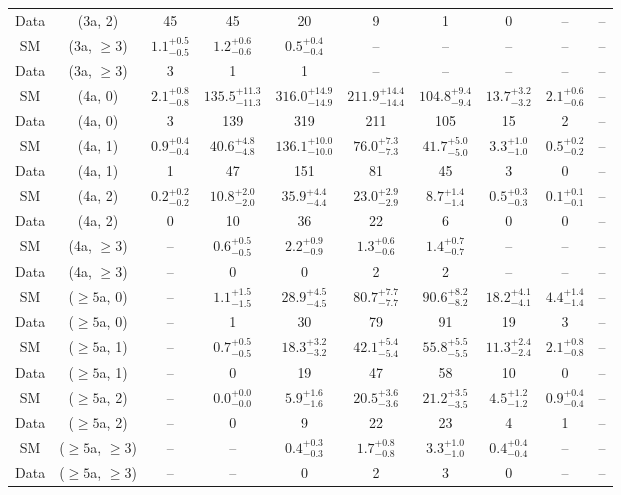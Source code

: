 \begin{table}[h!]
{\begin{tabular}{cccccccccc}
	Data & (3a, 2) & 45 & 45 & 20 & 9 & 1 & 0 & -- & -- \\[0.5ex] 
	SM & (3a, $\ge3$) & $1.1^{+ 0.5 }_{- 0.5 }$ & $1.2^{+ 0.6 }_{- 0.6 }$ & $0.5^{+ 0.4 }_{- 0.4 }$ & -- & -- & -- & -- & -- \\[0.5ex] 
	Data & (3a, $\ge3$) & 3 & 1 & 1 & -- & -- & -- & -- & -- \\[0.5ex] 
	SM & (4a, 0) & $2.1^{+ 0.8 }_{- 0.8 }$ & $135.5^{+ 11.3 }_{- 11.3 }$ & $316.0^{+ 14.9 }_{- 14.9 }$ & $211.9^{+ 14.4 }_{- 14.4 }$ & $104.8^{+ 9.4 }_{- 9.4 }$ & $13.7^{+ 3.2 }_{- 3.2 }$ & $2.1^{+ 0.6 }_{- 0.6 }$ & -- \\[0.5ex] 
	Data & (4a, 0) & 3 & 139 & 319 & 211 & 105 & 15 & 2 & -- \\[0.5ex] 
	SM & (4a, 1) & $0.9^{+ 0.4 }_{- 0.4 }$ & $40.6^{+ 4.8 }_{- 4.8 }$ & $136.1^{+ 10.0 }_{- 10.0 }$ & $76.0^{+ 7.3 }_{- 7.3 }$ & $41.7^{+ 5.0 }_{- 5.0 }$ & $3.3^{+ 1.0 }_{- 1.0 }$ & $0.5^{+ 0.2 }_{- 0.2 }$ & -- \\[0.5ex] 
	Data & (4a, 1) & 1 & 47 & 151 & 81 & 45 & 3 & 0 & -- \\[0.5ex] 
	SM & (4a, 2) & $0.2^{+ 0.2 }_{- 0.2 }$ & $10.8^{+ 2.0 }_{- 2.0 }$ & $35.9^{+ 4.4 }_{- 4.4 }$ & $23.0^{+ 2.9 }_{- 2.9 }$ & $8.7^{+ 1.4 }_{- 1.4 }$ & $0.5^{+ 0.3 }_{- 0.3 }$ & $0.1^{+ 0.1 }_{- 0.1 }$ & -- \\[0.5ex] 
	Data & (4a, 2) & 0 & 10 & 36 & 22 & 6 & 0 & 0 & -- \\[0.5ex] 
	SM & (4a, $\ge3$) & -- & $0.6^{+ 0.5 }_{- 0.5 }$ & $2.2^{+ 0.9 }_{- 0.9 }$ & $1.3^{+ 0.6 }_{- 0.6 }$ & $1.4^{+ 0.7 }_{- 0.7 }$ & -- & -- & -- \\[0.5ex] 
	Data & (4a, $\ge3$) & -- & 0 & 0 & 2 & 2 & -- & -- & -- \\[0.5ex] 
	SM & ($\ge5$a, 0) & -- & $1.1^{+ 1.5 }_{- 1.5 }$ & $28.9^{+ 4.5 }_{- 4.5 }$ & $80.7^{+ 7.7 }_{- 7.7 }$ & $90.6^{+ 8.2 }_{- 8.2 }$ & $18.2^{+ 4.1 }_{- 4.1 }$ & $4.4^{+ 1.4 }_{- 1.4 }$ & -- \\[0.5ex] 
	Data & ($\ge5$a, 0) & -- & 1 & 30 & 79 & 91 & 19 & 3 & -- \\[0.5ex] 
	SM & ($\ge5$a, 1) & -- & $0.7^{+ 0.5 }_{- 0.5 }$ & $18.3^{+ 3.2 }_{- 3.2 }$ & $42.1^{+ 5.4 }_{- 5.4 }$ & $55.8^{+ 5.5 }_{- 5.5 }$ & $11.3^{+ 2.4 }_{- 2.4 }$ & $2.1^{+ 0.8 }_{- 0.8 }$ & -- \\[0.5ex] 
	Data & ($\ge5$a, 1) & -- & 0 & 19 & 47 & 58 & 10 & 0 & -- \\[0.5ex] 
	SM & ($\ge5$a, 2) & -- & $0.0^{+ 0.0 }_{- 0.0 }$ & $5.9^{+ 1.6 }_{- 1.6 }$ & $20.5^{+ 3.6 }_{- 3.6 }$ & $21.2^{+ 3.5 }_{- 3.5 }$ & $4.5^{+ 1.2 }_{- 1.2 }$ & $0.9^{+ 0.4 }_{- 0.4 }$ & -- \\[0.5ex] 
	Data & ($\ge5$a, 2) & -- & 0 & 9 & 22 & 23 & 4 & 1 & -- \\[0.5ex] 
	SM & ($\ge5$a, $\ge3$) & -- & -- & $0.4^{+ 0.3 }_{- 0.3 }$ & $1.7^{+ 0.8 }_{- 0.8 }$ & $3.3^{+ 1.0 }_{- 1.0 }$ & $0.4^{+ 0.4 }_{- 0.4 }$ & -- & -- \\[0.5ex] 
	Data & ($\ge5$a, $\ge3$) & -- & -- & 0 & 2 & 3 & 0 & -- & -- \\[0.5ex] 
	\hline
	\hline
\end{tabular}}
\end{table}

